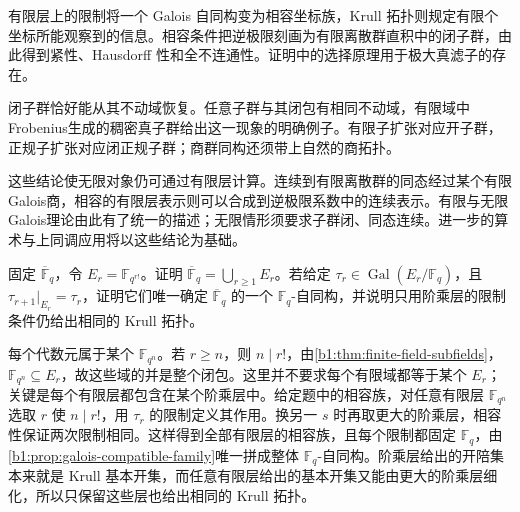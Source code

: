 





\begin{chaptersummary}
	有限层上的限制将一个 Galois 自同构变为相容坐标族，Krull 拓扑则规定有限个坐标所能观察到的信息。相容条件把逆极限刻画为有限离散群直积中的闭子群，由此得到紧性、Hausdorff 性和全不连通性。证明中的选择原理用于极大真滤子的存在。

	\ProseParagraphBreak
	闭子群恰好能从其不动域恢复。任意子群与其闭包有相同不动域，有限域中Frobenius生成的稠密真子群给出这一现象的明确例子。有限子扩张对应开子群，正规子扩张对应闭正规子群；商群同构还须带上自然的商拓扑。

	\ProseParagraphBreak
	这些结论使无限对象仍可通过有限层计算。连续到有限离散群的同态经过某个有限Galois商，相容的有限层表示则可以合成到逆极限系数中的连续表示。有限与无限Galois理论由此有了统一的描述；无限情形须要求子群闭、同态连续。进一步的算术与上同调应用将以这些结论为基础。
\end{chaptersummary}

\BookExercises

\begin{exercise}\label{b1:ex:22-1}
	固定 \(\overline{\mathbb F}_q\)，令 \(E_r=\mathbb F_{q^{r!}}\)。证明 \(\overline{\mathbb F}_q=\bigcup_{r\geq1}E_r\)。若给定 \(\tau_r\in\operatorname{Gal}(E_r/\mathbb F_q)\)，且 \(\tau_{r+1}|_{E_r}=\tau_r\)，证明它们唯一确定 \(\overline{\mathbb F}_q\) 的一个 \(\mathbb F_q\)-自同构，并说明只用阶乘层的限制条件仍给出相同的 Krull 拓扑。
\end{exercise}
\begin{solution}
	每个代数元属于某个 \(\mathbb F_{q^n}\)。若 \(r\geq n\)，则 \(n\mid r!\)，由\cref{b1:thm:finite-field-subfields}，\(\mathbb F_{q^n}\subseteq E_r\)，故这些域的并是整个闭包。这里并不要求每个有限域都等于某个 \(E_r\)；关键是每个有限层都包含在某个阶乘层中。给定题中的相容族，对任意有限层 \(\mathbb F_{q^n}\) 选取 \(r\) 使 \(n\mid r!\)，用 \(\tau_r\) 的限制定义其作用。换另一 \(s\) 时再取更大的阶乘层，相容性保证两次限制相同。这样得到全部有限层的相容族，且每个限制都固定 \(\mathbb F_q\)，由\cref{b1:prop:galois-compatible-family}唯一拼成整体 \(\mathbb F_q\)-自同构。阶乘层给出的开陪集本来就是 Krull 基本开集，而任意有限层给出的基本开集又能由更大的阶乘层细化，所以只保留这些层也给出相同的 Krull 拓扑。
\end{solution}

